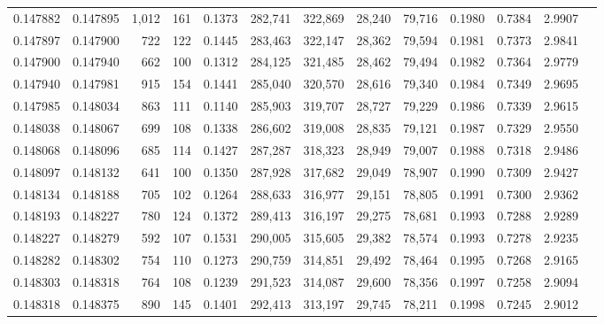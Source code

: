 \begin{tabular}{rrrrrrrrrrrrr}
0.147882 & 0.147895 & 1,012 & 161 &                                     0.1373 & 282,741 & 322,869 &  28,240 &  79,716 & 0.1980 & 0.7384 & 2.9907 \\
0.147897 & 0.147900 &   722 & 122 &                                     0.1445 & 283,463 & 322,147 &  28,362 &  79,594 & 0.1981 & 0.7373 & 2.9841 \\
0.147900 & 0.147940 &   662 & 100 &                                     0.1312 & 284,125 & 321,485 &  28,462 &  79,494 & 0.1982 & 0.7364 & 2.9779 \\
0.147940 & 0.147981 &   915 & 154 &                                     0.1441 & 285,040 & 320,570 &  28,616 &  79,340 & 0.1984 & 0.7349 & 2.9695 \\
0.147985 & 0.148034 &   863 & 111 &                                     0.1140 & 285,903 & 319,707 &  28,727 &  79,229 & 0.1986 & 0.7339 & 2.9615 \\
0.148038 & 0.148067 &   699 & 108 &                                     0.1338 & 286,602 & 319,008 &  28,835 &  79,121 & 0.1987 & 0.7329 & 2.9550 \\
0.148068 & 0.148096 &   685 & 114 &                                     0.1427 & 287,287 & 318,323 &  28,949 &  79,007 & 0.1988 & 0.7318 & 2.9486 \\
0.148097 & 0.148132 &   641 & 100 &                                     0.1350 & 287,928 & 317,682 &  29,049 &  78,907 & 0.1990 & 0.7309 & 2.9427 \\
0.148134 & 0.148188 &   705 & 102 &                                     0.1264 & 288,633 & 316,977 &  29,151 &  78,805 & 0.1991 & 0.7300 & 2.9362 \\
0.148193 & 0.148227 &   780 & 124 &                                     0.1372 & 289,413 & 316,197 &  29,275 &  78,681 & 0.1993 & 0.7288 & 2.9289 \\
0.148227 & 0.148279 &   592 & 107 &                                     0.1531 & 290,005 & 315,605 &  29,382 &  78,574 & 0.1993 & 0.7278 & 2.9235 \\
0.148282 & 0.148302 &   754 & 110 &                                     0.1273 & 290,759 & 314,851 &  29,492 &  78,464 & 0.1995 & 0.7268 & 2.9165 \\
0.148303 & 0.148318 &   764 & 108 &                                     0.1239 & 291,523 & 314,087 &  29,600 &  78,356 & 0.1997 & 0.7258 & 2.9094 \\
0.148318 & 0.148375 &   890 & 145 &                                     0.1401 & 292,413 & 313,197 &  29,745 &  78,211 & 0.1998 & 0.7245 & 2.9012 \\

\end{tabular}
